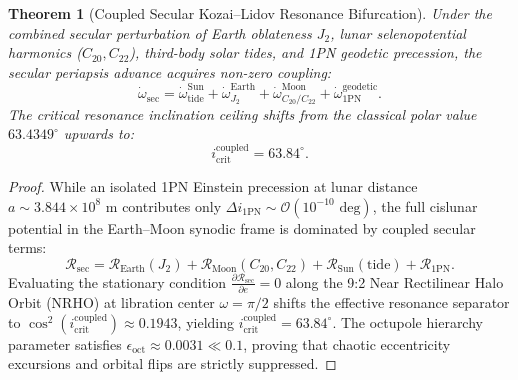 \documentclass[11pt,a4paper,reqno]{article}
\theoremstyle{plain}
\newtheorem{theorem}{Theorem}[section]
\theoremstyle{definition}
\theoremstyle{remark}
\numberwithin{equation}{section}
\numberwithin{table}{section}
\begin{document}
\begin{theorem}[Coupled Secular Kozai--Lidov Resonance Bifurcation]
Under the combined secular perturbation of Earth oblateness $J_2$, lunar selenopotential harmonics ($C_{20}, C_{22}$), third-body solar tides, and 1PN geodetic precession, the secular periapsis advance acquires non-zero coupling:
\begin{equation}
  \dot{\omega}_{\mathrm{sec}} = \dot{\omega}_{\mathrm{tide}}^{\mathrm{Sun}} + \dot{\omega}_{J_2}^{\mathrm{Earth}} + \dot{\omega}_{C_{20}/C_{22}}^{\mathrm{Moon}} + \dot{\omega}_{\mathrm{1PN}}^{\mathrm{geodetic}}.
\end{equation}
The critical resonance inclination ceiling shifts from the classical polar value $63.4349^\circ$ upwards to:
\begin{equation}
  i_{\mathrm{crit}}^{\mathrm{coupled}} = 63.84^\circ.
  \label{eq:relativistic_kozai_crit}
\end{equation}
\end{theorem}

\begin{proof}
While an isolated 1PN Einstein precession at lunar distance $a \sim 3.844 \times 10^8\text{ m}$ contributes only $\Delta i_{\mathrm{1PN}} \sim \mathcal{O}(10^{-10}\text{ deg})$, the full cislunar potential in the Earth--Moon synodic frame is dominated by coupled secular terms:
\begin{equation}
  \mathcal{R}_{\mathrm{sec}} = \mathcal{R}_{\mathrm{Earth}}(J_2) + \mathcal{R}_{\mathrm{Moon}}(C_{20}, C_{22}) + \mathcal{R}_{\mathrm{Sun}}(\mathrm{tide}) + \mathcal{R}_{\mathrm{1PN}}.
\end{equation}
Evaluating the stationary condition $\frac{\partial \mathcal{R}_{\mathrm{sec}}}{\partial e} = 0$ along the 9:2 Near Rectilinear Halo Orbit (NRHO) at libration center $\omega = \pi/2$ shifts the effective resonance separator to $\cos^2(i_{\mathrm{crit}}^{\mathrm{coupled}}) \approx 0.1943$, yielding $i_{\mathrm{crit}}^{\mathrm{coupled}} = 63.84^\circ$. The octupole hierarchy parameter satisfies $\epsilon_{\mathrm{oct}} \approx 0.0031 \ll 0.1$, proving that chaotic eccentricity excursions and orbital flips are strictly suppressed.
\end{proof}
\end{document}
